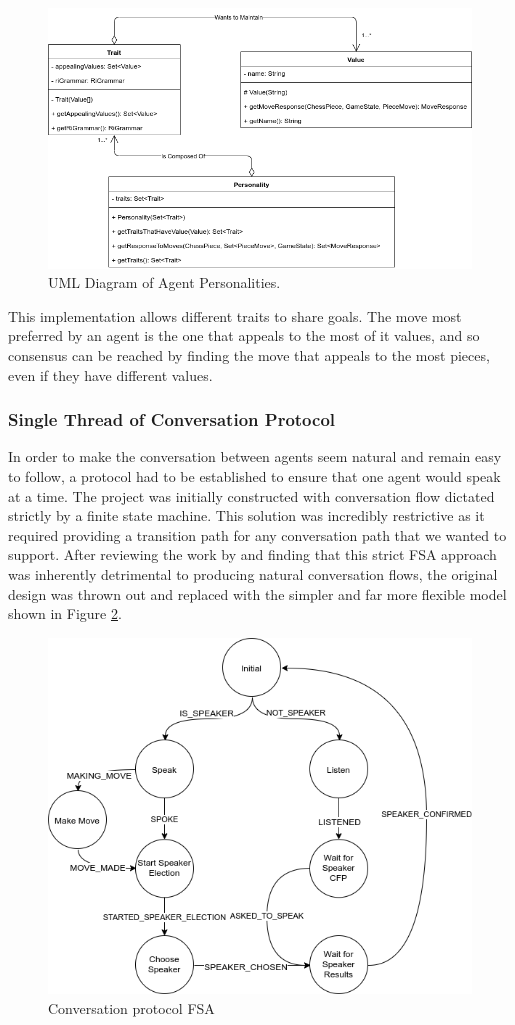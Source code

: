 \documentclass{article}
\begin{document}
\begin{figure}[]
	\centering
	\includegraphics[width=0.8\linewidth]{images/personality}
	\caption{UML Diagram of Agent Personalities.}
	\label{fig:personalityuml}
\end{figure}

This implementation allows different traits to share goals. The move most preferred by an agent is the one that appeals to the most of it values, and so consensus can be reached by finding the move that appeals to the most pieces, even if they have different values.

\subsubsection{Single Thread of Conversation Protocol}

In order to make the conversation between agents seem natural and remain easy to follow, a protocol had to be established to ensure that one agent would speak at a time. The project was initially constructed with conversation flow dictated strictly by a finite state machine. This solution was incredibly restrictive as it required providing a transition path for any conversation path that we wanted to support. After reviewing the work by \cite{tartan} and finding that this strict FSA approach was inherently detrimental to producing natural conversation flows, the original design was thrown out and replaced with the simpler and far more flexible model shown in Figure \ref{fig:conversationfsa}.

\begin{figure}[]
	\centering
	\includegraphics[width=0.8\linewidth]{images/conversationfsa}
	\caption{Conversation protocol FSA}
	\label{fig:conversationfsa}
\end{figure}
\end{document}
